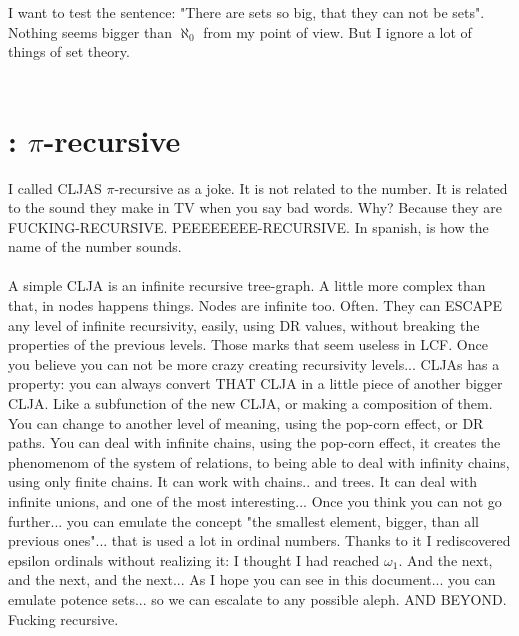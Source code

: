 		\noindent
		I want to test the sentence: "There are sets so big, that they can not be sets". Nothing seems bigger than $\aleph_{0}$ from my point of view. But I ignore a lot of things of set theory.
		\\\\
		
		
	
	\section{\:: $\pi$-recursive}
	
		\noindent
		I called CLJAS $\pi$-recursive as a joke. It is not related to the number. It is related to the sound they make in TV when you say bad words. Why? Because they are FUCKING-RECURSIVE. PEEEEEEEE-RECURSIVE. In spanish, is how the name of the number sounds.
		\\\\
		
		\noindent
		A simple CLJA is an infinite recursive tree-graph. A little more complex than that, in nodes happens things. Nodes are infinite too. Often. They can ESCAPE any level of infinite recursivity, easily, using DR values, without breaking the properties of the previous levels. Those marks that seem useless in LCF. Once you believe you can not be more crazy creating recursivity levels... CLJAs has a property: you can always convert THAT CLJA in a little piece of another bigger CLJA. Like a subfunction of the new CLJA, or making a composition of them. You can change to another level of meaning, using the pop-corn effect, or DR paths. You can deal with infinite chains, using the pop-corn effect, it creates the phenomenom of the system of relations, to being able to deal with infinity chains, using only finite chains. It can work with chains.. and trees. It can deal with infinite unions, and one of the most interesting... Once you think you can not go further... you can emulate the concept "the smallest element, bigger, than all previous ones"... that is used a lot in ordinal numbers. Thanks to it I rediscovered epsilon ordinals without realizing it: I thought I had reached $\omega_{1}$. And the next, and the next, and the next... As I hope you can see in this document... you can emulate potence sets... so we can escalate to any possible aleph. AND BEYOND. Fucking recursive.
		\\\\
		
